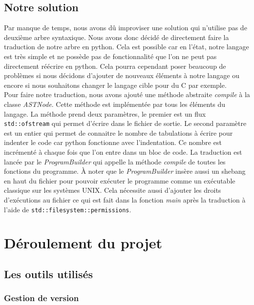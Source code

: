 \documentclass[a4paper]{article}%
\begin{document}
\subsection{Notre solution}

Par manque de temps, nous avons dû improviser une solution qui n'utilise pas de
deuxième arbre syntaxique. Nous avons donc décidé de directement faire la
traduction de notre arbre en python. Cela est possible car en l'état, notre
langage est très simple et ne possède pas de fonctionnalité que l'on ne peut pas
directement réécrire en python. Cela pourra cependant poser beaucoup de
problèmes si nous décidons d'ajouter de nouveaux éléments à notre langage ou
encore si nous souhaitons changer le langage cible pour du C par exemple.\\

Pour faire notre traduction, nous avons ajouté une méthode abstraite
\textit{compile} à la classe \textit{ASTNode}. Cette méthode est implémentée par
tous les éléments du langage. La méthode prend deux paramètres, le premier est un
flux \lstinline{std::ofstream} qui permet d'écrire dans le fichier de sortie. Le
second paramètre est un entier qui permet de connaitre le nombre de tabulations
à écrire pour indenter le code car python fonctionne avec l'indentation. Ce
nombre est incrémenté à chaque fois que l'on entre dans un bloc de code. La
traduction est lancée par le \textit{ProgramBuilder} qui appelle la méthode
\textit{compile} de toutes les fonctions du programme. À noter que le
\textit{ProgramBuilder} insère aussi un \gls{shebang} en haut du fichier pour
pouvoir exécuter le programme comme un exécutable classique sur les systèmes
UNIX. Cela nécessite aussi d'ajouter les droits d'exécutions au fichier ce qui
est fait dans la fonction \textit{main} après la traduction à l'aide de
\lstinline{std::filesystem::permissions}.

\section{Déroulement du projet}

\subsection{Les outils utilisés}

\subsubsection{Gestion de version}
\end{document}
